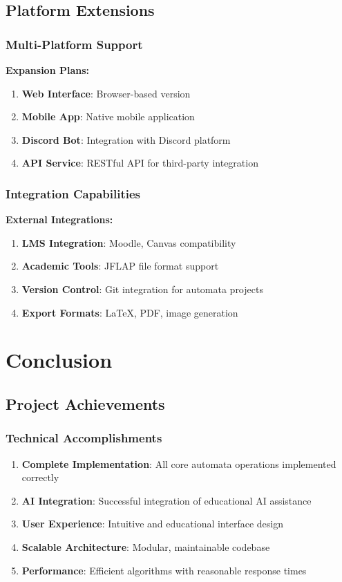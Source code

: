 \documentclass[12pt]{article}
\begin{document}
\subsection{Platform Extensions}

\subsubsection{Multi-Platform Support}
\textbf{Expansion Plans:}
\begin{enumerate}
    \item \textbf{Web Interface}: Browser-based version
    \item \textbf{Mobile App}: Native mobile application
    \item \textbf{Discord Bot}: Integration with Discord platform
    \item \textbf{API Service}: RESTful API for third-party integration
\end{enumerate}

\subsubsection{Integration Capabilities}
\textbf{External Integrations:}
\begin{enumerate}
    \item \textbf{LMS Integration}: Moodle, Canvas compatibility
    \item \textbf{Academic Tools}: JFLAP file format support
    \item \textbf{Version Control}: Git integration for automata projects
    \item \textbf{Export Formats}: LaTeX, PDF, image generation
\end{enumerate}

\section{Conclusion}

\subsection{Project Achievements}

\subsubsection{Technical Accomplishments}
\begin{enumerate}
    \item \textbf{Complete Implementation}: All core automata operations implemented correctly
    \item \textbf{AI Integration}: Successful integration of educational AI assistance
    \item \textbf{User Experience}: Intuitive and educational interface design
    \item \textbf{Scalable Architecture}: Modular, maintainable codebase
    \item \textbf{Performance}: Efficient algorithms with reasonable response times
\end{enumerate}
\end{document}
